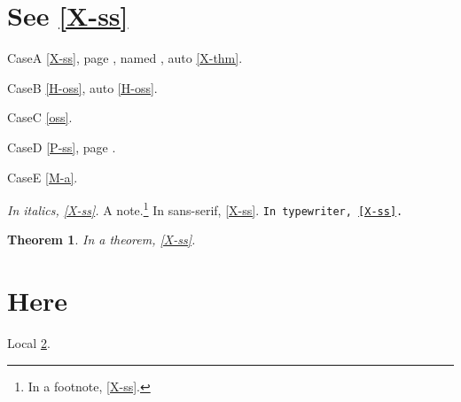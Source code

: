 \documentclass{article}
\newtheorem{theorem}{Theorem}
\begin{document}
\section{See \ref{X-ss}}
CaseA \ref{X-ss}, page \pageref{X-front}, named ,
auto \autoref{X-thm}.

CaseB \ref{H-oss}, auto \autoref{H-oss}.

CaseC \ref{oss}.

CaseD \ref{P-ss}, page \pageref{P-front}.

CaseE \ref{M-a}.

\textit{In italics, \ref{X-ss}.}
A note.\footnote{In a footnote, \ref{X-ss}.}
\textsf{In sans-serif, \ref{X-ss}.}
\texttt{In typewriter, \ref{X-ss}.}

\begin{theorem}
In a theorem, \ref{X-ss}.
\end{theorem}

\section{Here}\label{here}
Local \ref{here}.
\end{document}

